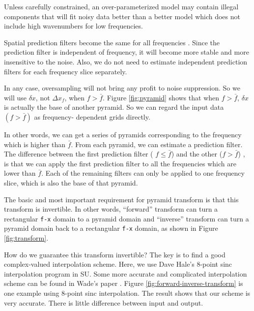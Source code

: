
Unless carefully constrained, an over-parameterized model may
contain illegal components that will fit noisy data better
than a better model which does not include high wavenumbers
for low frequencies. 
\par
Spatial prediction filters become the same for all frequencies
\cite {Nichols.1996}.
Since the prediction filter is independent of frequency, 
it will become more stable and more 
insensitive to the noise. Also, we do not need to estimate independent
prediction filters for each frequency slice separately.
\par
In any case, oversampling will not bring any profit to noise suppression. So 
we will use $\delta x$, not $\Delta x_f$, when $f>\bar{f}$. 
Figure \ref{fig:pyramid} shows that when $f>\bar{f}$, $\delta x$ is actually the 
base of another pyramid. So we can regard the input data $(f>\bar{f})$ as 
frequency- dependent grids directly.
\par
In other words, we can get a series of pyramids corresponding to the 
frequency which is higher than $\bar{f}$. From each pyramid, we can estimate 
a prediction filter. The difference between the first prediction filter (
$f \le \bar{f}$) and the other ($f>\bar{f}$) , 
is that we can apply the first prediction filter to all the frequencies which 
are lower than $\bar{f}$. 
Each of the remaining filters can only be applied to one frequency slice, 
which is also the base of that pyramid. 

\par
The basic and most important requirement for pyramid 
transform is that this transform is invertible. In other words, ``forward'' 
transform can turn a rectangular {\tt f-x} domain to a pyramid domain and 
``inverse'' transform can turn a pyramid domain back to a rectangular {\tt f-x}
 domain, as shown in Figure \ref{fig:transform}.



How do we guarantee this transform invertible? The key is to find a good 
complex-valued interpolation scheme. Here, we use Dave Hale's 8-point sinc 
interpolation program in SU. Some more accurate and complicated interpolation 
scheme can be found in Wade's paper . 
Figure \ref{fig:forward-inverse-transform} is one example using 8-point sinc 
interpolation. 
The result shows that our scheme is very accurate. There is little difference 
between input and output.

